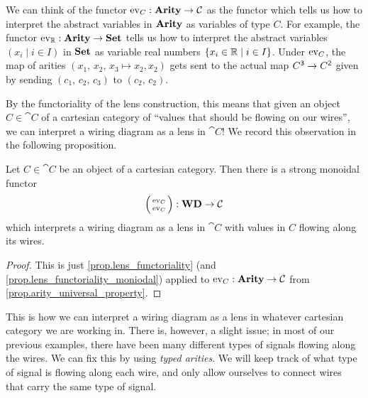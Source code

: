 \documentclass[DynamicalBook]{subfiles}
\begin{document}
We can think of the functor $\mathrm{ev}_C : \textbf{Arity} \to \mathcal{C}$ as the functor
which tells us how to interpret the abstract variables in $\textbf{Arity}$ as variables
of type $C$. For example, the functor $\mathrm{ev}_{\mathbb{R}} : \textbf{Arity} \to \textbf{Set}$ tells
us how to interpret the abstract variables $(x_i \mid i \in I)$ in $\textbf{Set}$ as
variable real numbers $\{x_i \in \mathbb{R} \mid i \in I\}$. Under $\mathrm{ev}_{C}$, the
map of arities $(x_1,\, x_2,\, x_3 \mapsto x_2, x_2)$ gets sent to the actual map
$C^{\mathsf{3}} \to C^{\mathsf{2}}$ given by sending $(c_1,\, c_2,\, c_3)$ to
$(c_2,\, c_2)$.

By the functoriality of the lens construction, this means that given an object
$C \in \cat{C}$ of a cartesian category of ``values that should be flowing on
our wires'', we can interpret a wiring diagram as a lens in $\cat{C}$! We record
this observation in the following proposition. 
\begin{proposition}\label{prop.wiring_diagram_as_lens}
  Let $C \in \cat{C}$ be an object of a cartesian category. Then there is a
  strong monoidal functor
  $$\lens{\Fun{ev}_C}{\Fun{ev}_C} : \Cat{WD} \to \cat{C}$$
  which interprets a wiring diagram as a lens in $\cat{C}$ with values in $C$
  flowing along its wires.
\end{proposition}
\begin{proof}
  This is just \cref{prop.lens_functoriality} (and
  \cref{prop.lens_functoriality_moniodal}) applied to $\mathrm{ev}_C : \textbf{Arity} \to
  \mathcal{C}$ from \cref{prop.arity_universal_property}.
\end{proof}

This is how we can interpret a wiring diagram as a lens in whatever cartesian category we
are working in. There is, however, a slight issue; in most of our previous
examples, there have been many different types of signals flowing along the
wires. We can fix this by using \emph{typed arities}. We will keep track of what
type of signal is flowing along each wire, and only allow ourselves to connect
wires that carry the same type of signal.
\end{document}
